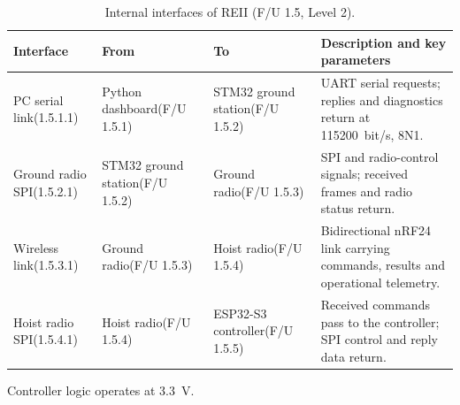 \begin{table}[H]
    \centering
    \footnotesize
    \caption{Internal interfaces of REII (F/U 1.5, Level 2).}
    \label{tab:reii-internal}

    \begin{tabularx}{\textwidth}{@{}
        >{\raggedright\arraybackslash}p{2.15cm}
        >{\raggedright\arraybackslash}p{2.7cm}
        >{\raggedright\arraybackslash}p{2.9cm}
        >{\raggedright\arraybackslash}X
    @{}}
        \toprule
        \textbf{Interface} &
        \textbf{From} &
        \textbf{To} &
        \textbf{Description and key parameters} \\
        \midrule

        PC serial link\newline (1.5.1.1) &
        Python dashboard\newline (F/U 1.5.1) &
        STM32 ground station\newline (F/U 1.5.2) &
        UART serial requests; replies and diagnostics return
        at 115200~bit/s, 8N1.
        \\[3pt]

        Ground radio SPI\newline (1.5.2.1) &
        STM32 ground station\newline (F/U 1.5.2) &
        Ground radio\newline (F/U 1.5.3) &
        SPI and radio-control signals; received frames and
        radio status return.
        \\[3pt]

        Wireless link\newline (1.5.3.1) &
        Ground radio\newline (F/U 1.5.3) &
        Hoist radio\newline (F/U 1.5.4) &
        Bidirectional nRF24 link carrying commands, results
        and operational telemetry.
        \\[3pt]

        Hoist radio SPI\newline (1.5.4.1) &
        Hoist radio\newline (F/U 1.5.4) &
        ESP32-S3 controller\newline (F/U 1.5.5) &
        Received commands pass to the controller; SPI control
        and reply data return.
        \\

        \bottomrule
    \end{tabularx}
\end{table}

\endgroup

\noindent
Controller logic operates at 3.3~V.
\cite{nwu_s3_board2026}




